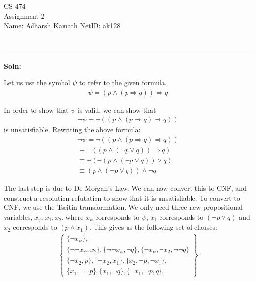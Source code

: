 \documentclass[12pt,letterpaper, onecolumn]{exam}
\begin{document}
\begingroup
\centering
\LARGE CS 474\\
\large Assignment 2 \\[0.5em]
\endgroup
\begingroup
\normalsize \quad\quad\quad Name: Adharsh Kamath \quad\quad\quad \quad\quad\quad \quad\quad\quad \quad\quad\quad \quad  NetID: ak128 \par\
\endgroup
\rule{17cm}{0.4pt}
\pointsdroppedatright   %
\printanswers
\renewcommand{\solutiontitle}{\noindent\textbf{Soln:}\enspace}
\newcommand{\cheading}[1]{{\underline{\textit{#1}}}}

\renewcommand{\questionshook}{%
	\setlength{\leftmargin}{18pt}%
	\setlength{\labelwidth}{-\labelsep}%
}
\begin{questions}
	\question[]
	\solutiontitle

	Let us use the symbol $\psi$ to refer to the given formula.
	\begin{align*}
		\psi = \left( p \land  (p \Rightarrow q) \right) \Rightarrow q
	\end{align*}

	In order to show that $\psi$ is valid, we can show that 
	\begin{align*}
		\neg \psi = \neg \left( (p \land  (p \Rightarrow q)  \Rightarrow q) \right)
	\end{align*}
	is unsatisfiable. Rewriting the above formula:
	\begin{align*}
		\neg \psi = \neg \left( (p \land  (p \Rightarrow q)  \Rightarrow q) \right) \\
					\equiv \neg \left( (p \land  (\neg p \lor q) ) \Rightarrow q \right) \\
					\equiv \neg \left( \neg (p \land  (\neg p \lor q) ) \lor q \right) \\
					\equiv (p \land  (\neg p \lor q) ) \land \neg q
	\end{align*}

	The last step is due to De Morgan's Law. We can now convert this to CNF, and construct a resolution refutation to show that it is unsatisfiable.
	To convert to CNF, we use the Tseitin transformation. We only need three new propositional variables, $x_{\psi}, x_1, x_2$,
	where $x_{\psi}$ corresponds to $\psi$, $x_1$ corresponds to $(\neg p \lor q)$ and $x_2$ corresponds to $(p \land x_1)$.
	This gives us the following set of clauses:
	\begin{align*}
		\left .
			\begin{cases}
					\{ \neg x_{\psi} \}, \\
					\{ \neg \neg x_{\psi}, x_2 \}, \{ \neg \neg x_{\psi}, \neg q \}, \{ \neg x_{\psi}, \neg x_2, \neg \neg q \} \\
					\{ \neg x_2, p \}, \{ \neg x_2, x_1 \}, \{ x_2, \neg p, \neg x_1  \}, \\
					\{ x_1, \neg \neg p \}, \{ x_1, \neg q \}, \{ \neg x_1, \neg p, q \}, 
			\end{cases}
		\right\}
	\end{align*}


\end{questions}
\end{document}
